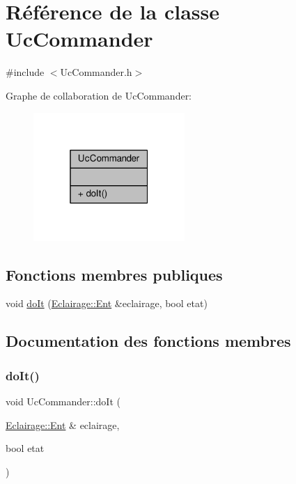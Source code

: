 \hypertarget{classUcCommander}{}\section{Référence de la classe Uc\+Commander}
\label{classUcCommander}


{\ttfamily \#include $<$Uc\+Commander.\+h$>$}



Graphe de collaboration de Uc\+Commander\+:\nopagebreak
\begin{figure}[H]
\begin{center}
\leavevmode
\includegraphics[width=163pt]{classUcCommander__coll__graph}
\end{center}
\end{figure}
\subsection*{Fonctions membres publiques}
\begin{DoxyCompactItemize}
\item 
void \hyperlink{classUcCommander_a692e86b498f3d897f122479ec1954ed8}{do\+It} (\hyperlink{classEclairage_1_1Ent}{Eclairage\+::\+Ent} \&eclairage, bool etat)
\end{DoxyCompactItemize}


\subsection{Documentation des fonctions membres}
\mbox{\label{classUcCommander_a692e86b498f3d897f122479ec1954ed8}} 
\subsubsection{\texorpdfstring{do\+It()}{doIt()}}
{\footnotesize\ttfamily void Uc\+Commander\+::do\+It (\begin{DoxyParamCaption}\item[{\hyperlink{classEclairage_1_1Ent}{Eclairage\+::\+Ent} \&}]{eclairage,  }\item[{bool}]{etat }\end{DoxyParamCaption})}


